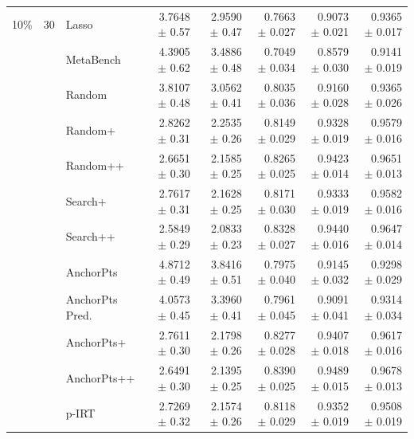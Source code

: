 \begin{longtable}{llp{}rrrrr}
\midrule
10\% & 30 & Lasso & 3.7648 {\scriptsize $\pm$ 0.57} & 2.9590 {\scriptsize $\pm$ 0.47} & 0.7663 {\scriptsize $\pm$ 0.027} & 0.9073 {\scriptsize $\pm$ 0.021} & 0.9365 {\scriptsize $\pm$ 0.017} \\
 &  & MetaBench & 4.3905 {\scriptsize $\pm$ 0.62} & 3.4886 {\scriptsize $\pm$ 0.48} & 0.7049 {\scriptsize $\pm$ 0.034} & 0.8579 {\scriptsize $\pm$ 0.030} & 0.9141 {\scriptsize $\pm$ 0.019} \\
 &  & Random & 3.8107 {\scriptsize $\pm$ 0.48} & 3.0562 {\scriptsize $\pm$ 0.41} & 0.8035 {\scriptsize $\pm$ 0.036} & 0.9160 {\scriptsize $\pm$ 0.028} & 0.9365 {\scriptsize $\pm$ 0.026} \\
 &  & Random+ & 2.8262 {\scriptsize $\pm$ 0.31} & 2.2535 {\scriptsize $\pm$ 0.26} & 0.8149 {\scriptsize $\pm$ 0.029} & 0.9328 {\scriptsize $\pm$ 0.019} & 0.9579 {\scriptsize $\pm$ 0.016} \\
 &  & Random++ & 2.6651 {\scriptsize $\pm$ 0.30} & 2.1585 {\scriptsize $\pm$ 0.25} & 0.8265 {\scriptsize $\pm$ 0.025} & 0.9423 {\scriptsize $\pm$ 0.014} & 0.9651 {\scriptsize $\pm$ 0.013} \\
 &  & Search+ & 2.7617 {\scriptsize $\pm$ 0.31} & 2.1628 {\scriptsize $\pm$ 0.25} & 0.8171 {\scriptsize $\pm$ 0.030} & 0.9333 {\scriptsize $\pm$ 0.019} & 0.9582 {\scriptsize $\pm$ 0.016} \\
 &  & Search++ & 2.5849 {\scriptsize $\pm$ 0.29} & 2.0833 {\scriptsize $\pm$ 0.23} & 0.8328 {\scriptsize $\pm$ 0.027} & 0.9440 {\scriptsize $\pm$ 0.016} & 0.9647 {\scriptsize $\pm$ 0.014} \\
 &  & AnchorPts & 4.8712 {\scriptsize $\pm$ 0.49} & 3.8416 {\scriptsize $\pm$ 0.51} & 0.7975 {\scriptsize $\pm$ 0.040} & 0.9145 {\scriptsize $\pm$ 0.032} & 0.9298 {\scriptsize $\pm$ 0.029} \\
 &  & AnchorPts Pred. & 4.0573 {\scriptsize $\pm$ 0.45} & 3.3960 {\scriptsize $\pm$ 0.41} & 0.7961 {\scriptsize $\pm$ 0.045} & 0.9091 {\scriptsize $\pm$ 0.041} & 0.9314 {\scriptsize $\pm$ 0.034} \\
 &  & AnchorPts+ & 2.7611 {\scriptsize $\pm$ 0.30} & 2.1798 {\scriptsize $\pm$ 0.26} & 0.8277 {\scriptsize $\pm$ 0.028} & 0.9407 {\scriptsize $\pm$ 0.018} & 0.9617 {\scriptsize $\pm$ 0.016} \\
 &  & AnchorPts++ & 2.6491 {\scriptsize $\pm$ 0.30} & 2.1395 {\scriptsize $\pm$ 0.25} & 0.8390 {\scriptsize $\pm$ 0.025} & 0.9489 {\scriptsize $\pm$ 0.015} & 0.9678 {\scriptsize $\pm$ 0.013} \\
 &  & p-IRT & 2.7269 {\scriptsize $\pm$ 0.32} & 2.1574 {\scriptsize $\pm$ 0.26} & 0.8118 {\scriptsize $\pm$ 0.029} & 0.9352 {\scriptsize $\pm$ 0.019} & 0.9508 {\scriptsize $\pm$ 0.019} \\

\end{longtable}
